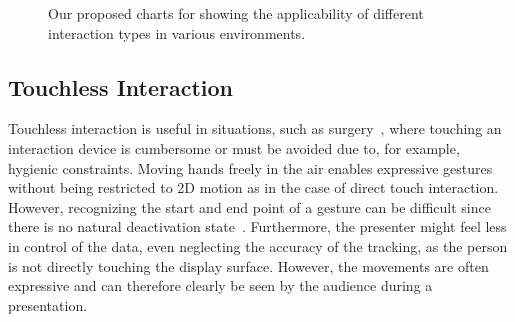 \documentclass[review,journal]{vgtc}         %
\begin{document}
\begin{figure}
    \centering
    \hfill
		\caption{Our proposed charts for showing the applicability of different interaction types in various environments.}
		\label{our_charts}
\end{figure}

\subsection{Touchless Interaction}\label{subsec:touchless}
Touchless interaction is useful in situations, such as surgery~\cite{Mentis:2012:IPI:2207676.2208536}, where touching an interaction device is cumbersome or must be avoided due to, for example, hygienic constraints.
Moving hands freely in the air enables expressive gestures without being restricted to 2D motion as in the case of direct touch interaction.
However, recognizing the start and end point of a gesture can be difficult since there is no natural deactivation state~\cite{Kirmizibayrak:2011:EGB:2087756.2087764}.
Furthermore, the presenter might feel less in control of the data, even neglecting the accuracy of the tracking, as the person is not directly touching the display surface.
However, the movements are often expressive and can therefore clearly be seen by the audience during a presentation.
\end{document}
